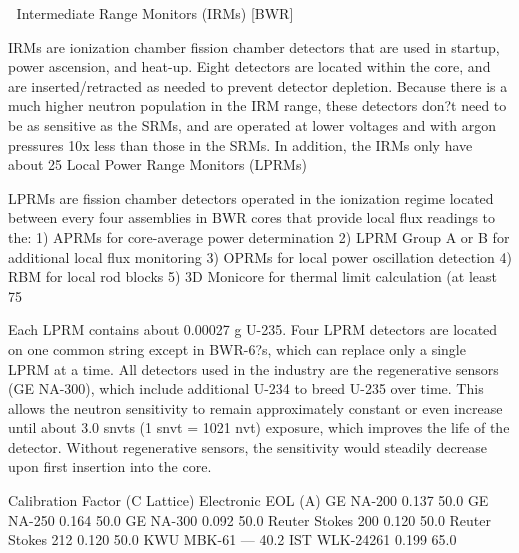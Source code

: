 \documentclass[10pt]{article}
\begin{document}

Intermediate Range Monitors (IRMs) [BWR]

IRMs are ionization chamber fission chamber detectors that are used in startup, power ascension, and heat-up. Eight detectors are located within the core, and are inserted/retracted as needed to prevent detector depletion. Because there is a much higher neutron population in the IRM range, these detectors don?t need to be as sensitive as the SRMs, and are operated at lower voltages and with argon pressures 10x less than those in the SRMs. In addition, the IRMs only have about 25%
Local Power Range Monitors (LPRMs)

LPRMs are fission chamber detectors operated in the ionization regime located between every four assemblies in BWR cores that provide local flux readings to the:
1)	APRMs for core-average power determination
2)	LPRM Group A or B for additional local flux monitoring
3)	OPRMs for local power oscillation detection
4)	RBM for local rod blocks
5)	3D Monicore for thermal limit calculation (at least 75%

Each LPRM contains about 0.00027 g U-235. Four LPRM detectors are located on one common string except in BWR-6?s, which can replace only a single LPRM at a time. All detectors used in the industry are the regenerative sensors (GE NA-300), which include additional U-234 to breed U-235 over time. This allows the neutron sensitivity to remain approximately constant or even increase until about 3.0 snvts (1 snvt = 1021 nvt) exposure, which improves the life of the detector. Without regenerative sensors, the sensitivity would steadily decrease upon first insertion into the core. 


Calibration Factor (C Lattice)
Electronic EOL (A)
GE NA-200
0.137
50.0
GE NA-250
0.164
50.0
GE NA-300
0.092
50.0
Reuter Stokes 200
0.120
50.0
Reuter Stokes 212
0.120
50.0
KWU MBK-61
---
40.2
IST WLK-24261
0.199
65.0
\end{document}
